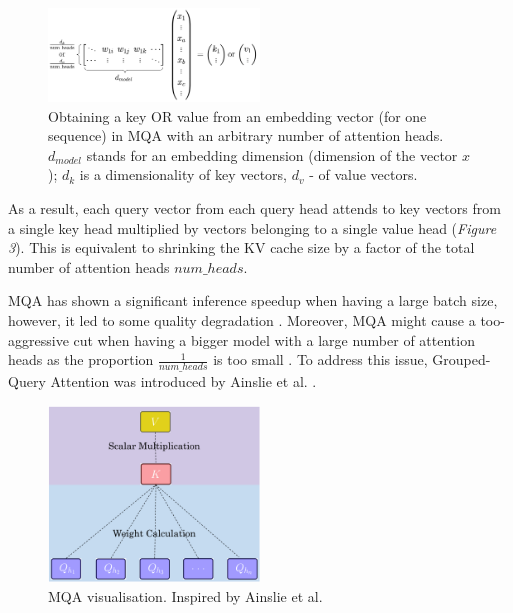 \begin{figure}[htbp] %
    \centering
    \includegraphics[width=0.5\textwidth]{research paper/images/obtaining_kv_mqa.png} %
    \captionsetup{justification=centering}
    \caption{Obtaining a key OR value from an embedding vector (for one sequence) in MQA with an arbitrary number of attention heads. $d_{model}$ stands for an embedding dimension (dimension of the vector $x$); $d_k$ is a dimensionality of key vectors, $d_v$ - of value vectors.}
    \label{fig:obtaining_kv_mqa}
\end{figure}

As a result, each query vector from each query head attends to key vectors from a single key head multiplied by vectors belonging to a single value head (\textit{Figure 3}). This is equivalent to shrinking the KV cache size by a factor of the total number of attention heads $num\_heads$.

MQA has shown a significant inference speedup when having a large batch size, however, it led to some quality degradation \cite{shazeer_fast_2019}. Moreover, MQA might cause a too-aggressive cut when having a bigger model with a large number of attention heads as the proportion $\frac{1}{num\_heads}$ is too small \cite{ainslie_gqa_2023}. To address this issue, Grouped-Query Attention was introduced by Ainslie et al. \cite{ainslie_gqa_2023}.

\begin{figure}[htbp] %
    \centering
    \includegraphics[width=0.5\textwidth]{research paper/images/mqa.png} %
    \captionsetup{justification=centering}
    \caption{MQA visualisation. Inspired by Ainslie et al. \cite{ainslie_gqa_2023}}
    \label{fig:mqa}
\end{figure}
